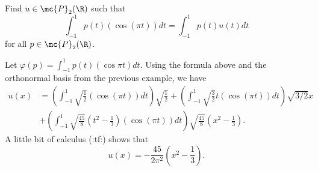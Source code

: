 \documentclass[math0540-lecture-notes.tex]{subfiles}
\begin{document}
\begin{example}
  Find $u\in \mc{P}_2(\R)$ such that \[
    \int_{-1}^1p(t)(\cos{(\pi t)})dt=\int_{-1}^1p(t)u(t)dt
  \] for all $p\in \mc{P}_2(\R)$.
\end{example}
\begin{solution}
  Let $\varphi(p)=\int_{-1}^1p(t)(\cos{\pi t})dt$. Using the formula above and the orthonormal basis
  from the previous example, we have
  \begin{align*}
    u(x)&= \left( \int_{-1}^1\sqrt{\frac{1}{2}}(\cos{(\pi t)})dt \right)\sqrt{\frac{1}{2}} +\left(
    \int_{-1}^1\sqrt{\frac{3}{2}}t(\cos{(\pi t)})dt \right) \sqrt{3/2}x \\
        &+\left( \int_{-1}^1\sqrt{\frac{45}{8}}(t^2-\frac{1}{3})(\cos{(\pi t)})dt \right)
        \sqrt{\frac{45}{8}}(x^2-\frac{1}{3})
  .\end{align*}
  A little bit of calculus (:tf:) shows that \[
    u(x)=-\frac{45}{2\pi^2}(x^2-\frac{1}{3})
  .\] 
\end{solution}
\end{document}
